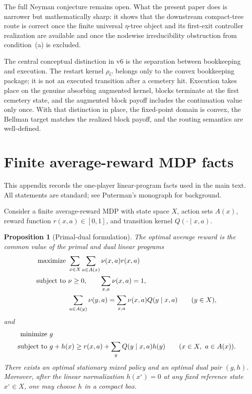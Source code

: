 \documentclass[12pt]{article}
\newtheorem{proposition}[theorem]{Proposition}
\theoremstyle{definition}
\newcommand{\1}{\mathbf{1}}
\begin{document}
The full Neyman conjecture remains open. What the present paper does is narrower
but mathematically sharp: it shows that the downstream compact-tree route is
correct once the finite universal $\eta$-tree object and its first-exit controller
realization are available and once the nodewise irreducibility obstruction from
condition~\textnormal{(a)} is excluded.

The central conceptual distinction in v6 is the separation between bookkeeping and
execution. The restart kernel $\rho_C$ belongs only to the convex bookkeeping
package; it is not an executed transition after a cemetery hit. Execution takes
place on the genuine absorbing augmented kernel, blocks terminate at the first
cemetery state, and the augmented block payoff includes the continuation value only
once. With that distinction in place, the fixed-point domain is convex, the
Bellman target matches the realized block payoff, and the routing semantics are
well-defined.

\appendix

\section{Finite average-reward MDP facts}
\label{app:mdp}

This appendix records the one-player linear-program facts used in the main text.
All statements are standard; see Puterman's monograph \cite{Puterman1994} for
background.

Consider a finite average-reward MDP with state space $X$, action sets $A(x)$,
reward function $r(x,a)\in[0,1]$, and transition kernel $Q(\cdot\mid x,a)$.

\begin{proposition}[Primal-dual formulation]
\label{prop:mdp-duality}
The optimal average reward is the common value of the primal and dual linear
programs
\begin{align*}
\textnormal{maximize }&\sum_{x\in X}\sum_{a\in A(x)}\nu(x,a)r(x,a)
\\
\textnormal{subject to }&\nu\ge 0,
\qquad \sum_{x,a}\nu(x,a)=1,
\\
&\sum_{a\in A(y)}\nu(y,a)=\sum_{x,a}\nu(x,a)Q(y\mid x,a)
\qquad (y\in X),
\end{align*}
and
\begin{align*}
\textnormal{minimize }&g
\\
\textnormal{subject to }&g+h(x)\ge r(x,a)+\sum_y Q(y\mid x,a)h(y)
\qquad (x\in X,\ a\in A(x)).
\end{align*}
There exists an optimal stationary mixed policy and an optimal dual pair $(g,h)$.
Moreover, after the linear normalization $h(x^\circ)=0$ at any fixed reference
state $x^\circ\in X$, one may choose $h$ in a compact box.
\end{proposition}
\end{document}
